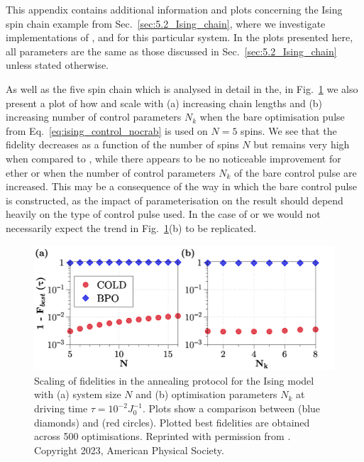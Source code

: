 This appendix contains additional information and plots concerning the Ising spin chain example from Sec.~\ref{sec:5.2_Ising_chain}, where we investigate implementations of ,  and  for this particular system. In the plots presented here, all parameters are the same as those discussed in Sec.~\ref{sec:5.2_Ising_chain} unless stated otherwise.

As well as the five spin chain which is analysed in detail in the, in Fig.~\ref{fig:ising_scalingN} we also present a plot of how   and  scale with (a) increasing chain lengths and (b) increasing number of control parameters $N_k$ when the bare optimisation pulse from Eq.~\eqref{eq:ising_control_nocrab} is used on $N=5$ spins. We see that the  fidelity decreases as a function of the number of spins $N$ but remains very high when compared to , while there appears to be no noticeable improvement for ether  or  when the number of control parameters $N_k$ of the bare control pulse are increased. This may be a consequence of the way in which the bare control pulse is constructed, as the impact of parameterisation on the result should depend heavily on the type of control pulse used. In the case of  or  we would not necessarily expect the trend in Fig.~\ref{fig:ising_scalingN}(b) to be replicated.

\begin{figure}[t!]
    \centering
    \includegraphics[width=\linewidth]{images/ScalingN.png} \caption[Plots of how final state fidelities scale using COLD and BPO for different system sizes and optimisable parameters.]{Scaling of fidelities in the annealing protocol for the Ising model with (a) system size $N$ and (b) optimisation parameters $N_k$ at driving time $\tau=10^{-2}J_0^{-1}$. Plots show a comparison between  (blue diamonds) and  (red circles). Plotted best fidelities are obtained across 500 optimisations. Reprinted with permission from \cite{cepaite_counterdiabatic_2023}. Copyright 2023, American Physical Society.}\label{fig:ising_scalingN}
\end{figure}

